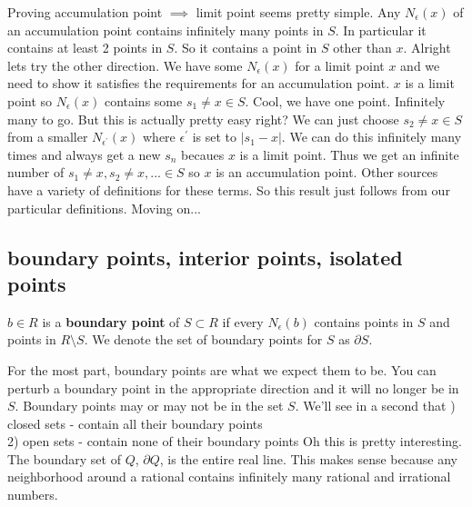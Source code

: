 \documentclass{article}
\begin{document}
Proving accumulation point \( \implies \) limit point seems pretty simple. 
Any \( N_\epsilon(x) \) of an accumulation point contains infinitely many points in  \( S \). 
In particular it contains at least 2 points in \( S \). So it contains a point in \( S \)
other than  \( x \).
\medbreak
Alright lets try the other direction. We have some \( N_\epsilon(x) \) for a limit point
\( x \) and we need to show it satisfies the requirements for an accumulation point. 
\( x \) is a limit point so \( N_\epsilon(x) \) contains some  \( s_1 \ne x \in S\).
Cool, we have one point. Infinitely many to go. But this is actually pretty easy right?
We can just choose \( s_2 \ne x \in S \) from a smaller \( N_{\epsilon^\prime}(x) \) 
where \( \epsilon^\prime \) is set to \( |s_1 - x| \). We can do this infinitely many times 
and always get a new \( s_n \) becaues \( x \) is a limit point. Thus we get an infinite number
of \( s_1 \ne x, s_2 \ne x, ... \in S \) so \( x \) is an accumulation point. 
\smallbreak
Other sources have a variety of definitions for these terms. So this result just 
follows from our particular definitions. Moving on...

\subsection*{boundary points, interior points, isolated points}

\begin{definition}
    \( b \in R \) is a \textbf{boundary point} of \( S \subset R \) if every \( N_\epsilon(b) \)
    contains points in \( S \) and points in \( R \setminus S \).
    We denote the set of boundary points for \( S \) as \( \partial S \).
\end{definition}

For the most part, boundary points are what we expect them to be. You can perturb a boundary
point in the appropriate direction and it will no longer be in \( S \).
\medbreak
Boundary points may or may not be in the set \( S \). We'll see in a second that 
) closed sets - contain all their boundary points \\
2) open sets - contain none of their boundary points
\medbreak
Oh this is pretty interesting. The boundary set of \( Q \),  \( \partial Q \), is the 
entire real line. This makes sense because any neighborhood around a rational 
contains infinitely many rational and irrational numbers.

\pagebreak
\end{document}
